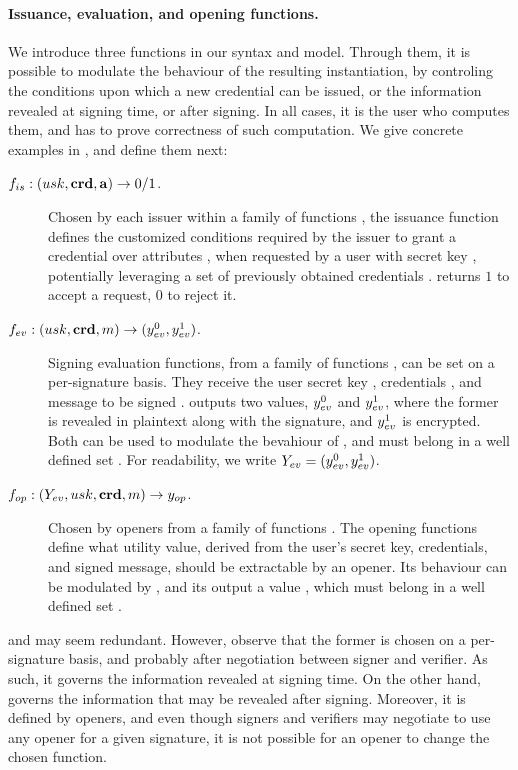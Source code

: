 \paragraph{Issuance, evaluation, and opening functions.} %
We introduce three functions in our syntax and model. Through them,
it is possible to modulate the behaviour of the resulting instantiation, by
controling the conditions upon which a new credential can be issued, or the
information revealed at signing time, or after signing. In all cases, it is
the user who computes them, and has to prove correctness of such computation.
We give concrete examples in , and define them next:

\begin{description}
\item[$f_{is}: (usk,\mathbf{crd},\mathbf{a})
  \rightarrow 0/1$.] Chosen by each issuer within a family of functions
  \famfissue, the issuance function defines the customized conditions required
  by the issuer to grant a credential over attributes \attrs, when requested by
  a user with secret key \usk, potentially leveraging a set of previously
  obtained credentials \scred. \fissue returns $1$ to accept a request, $0$ to
  reject it.
\item[$f_{ev}: (usk,\mathbf{crd},m)
  \rightarrow (y_{ev}^0,y_{ev}^1)$.] Signing evaluation functions, from a
  family of functions \famfeval, can be set on a per-signature basis. They
  receive the user secret key \usk, credentials \scred, and message to be signed
  \msg. \feval outputs two values, $y_{ev}^0$ and $y_{ev}^1$, where the former
  is revealed in plaintext along with the signature, and $y_{ev}^1$ is
  encrypted. Both can be used to modulate the bevahiour of \finsp, and must
  belong in a well defined set \rngfeval. For readability, we write $Y_{ev} =
  (y_{ev}^0,y_{ev}^1)$.
\item[$f_{op}: (Y_{ev},usk,\mathbf{crd},m) \rightarrow y_{op}$.]
  Chosen by openers from a family of functions \famfinsp. The opening
  functions define what utility value, derived from the user's secret key,
  credentials, and signed message, should be extractable by an opener. Its
  behaviour can be modulated by \Yeval, and its output a value \yinsp, which
  must belong in a well defined set \rngfinsp.
\end{description}

\feval and \finsp may seem redundant. However, observe that the former is chosen
on a per-signature basis, and probably after negotiation between signer and
verifier. As such, it governs the information revealed at signing time. On the
other hand, \finsp governs the information that may be revealed after signing.
Moreover, it is defined by openers, and even though signers and verifiers
may negotiate to use any opener for a given signature, it is not possible for
an opener to change the chosen function.

